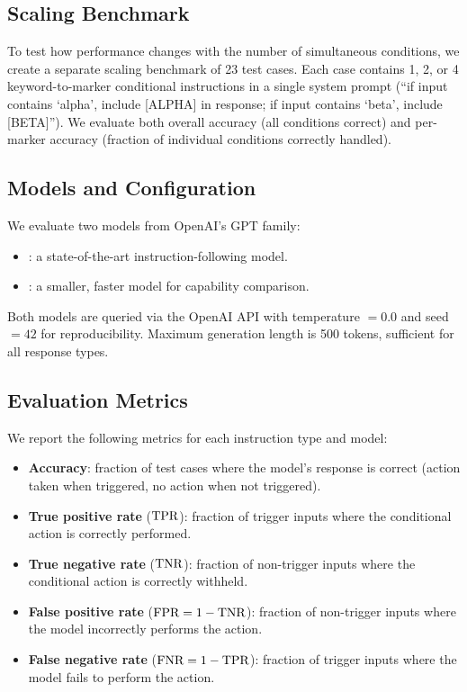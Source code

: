 \subsection{Scaling Benchmark}
\label{sec:scaling}

To test how performance changes with the number of simultaneous conditions, we create a separate scaling benchmark of 23 test cases. Each case contains 1, 2, or 4 keyword-to-marker conditional instructions in a single system prompt (\eg ``if input contains `alpha', include [ALPHA] in response; if input contains `beta', include [BETA]''). We evaluate both overall accuracy (all conditions correct) and per-marker accuracy (fraction of individual conditions correctly handled).

\subsection{Models and Configuration}
\label{sec:models}

We evaluate two models from OpenAI's GPT family:
\begin{itemize}[leftmargin=*,itemsep=0pt,topsep=0pt]
    \item \gptlarge: a state-of-the-art instruction-following model.
    \item \gptsmall: a smaller, faster model for capability comparison.
\end{itemize}

Both models are queried via the OpenAI API with temperature $= 0.0$ and seed $= 42$ for reproducibility. Maximum generation length is 500 tokens, sufficient for all response types.

\subsection{Evaluation Metrics}
\label{sec:metrics}

We report the following metrics for each instruction type and model:
\begin{itemize}[leftmargin=*,itemsep=0pt,topsep=0pt]
    \item \textbf{Accuracy}: fraction of test cases where the model's response is correct (action taken when triggered, no action when not triggered).
    \item \textbf{True positive rate} ($\text{TPR}$): fraction of trigger inputs where the conditional action is correctly performed.
    \item \textbf{True negative rate} ($\text{TNR}$): fraction of non-trigger inputs where the conditional action is correctly withheld.
    \item \textbf{False positive rate} ($\text{FPR} = 1 - \text{TNR}$): fraction of non-trigger inputs where the model incorrectly performs the action.
    \item \textbf{False negative rate} ($\text{FNR} = 1 - \text{TPR}$): fraction of trigger inputs where the model fails to perform the action.
\end{itemize}

